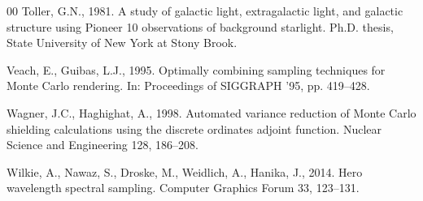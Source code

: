 \documentclass[preprint,12pt]{elsarticle}
\begin{document}
\begin{thebibliography}{00}
Toller, G.N., 1981. A study of galactic light, extragalactic light, and
galactic structure using Pioneer 10 observations of background starlight.
Ph.D. thesis, State University of New York at Stony Brook.

Veach, E., Guibas, L.J., 1995. Optimally combining sampling techniques
for Monte Carlo rendering. In: Proceedings of SIGGRAPH '95, pp. 419--428.

Wagner, J.C., Haghighat, A., 1998. Automated variance reduction of Monte
Carlo shielding calculations using the discrete ordinates adjoint
function. Nuclear Science and Engineering 128, 186--208.

Wilkie, A., Nawaz, S., Droske, M., Weidlich, A., Hanika, J., 2014. Hero
wavelength spectral sampling. Computer Graphics Forum 33, 123--131.

\end{thebibliography}
\end{document}
